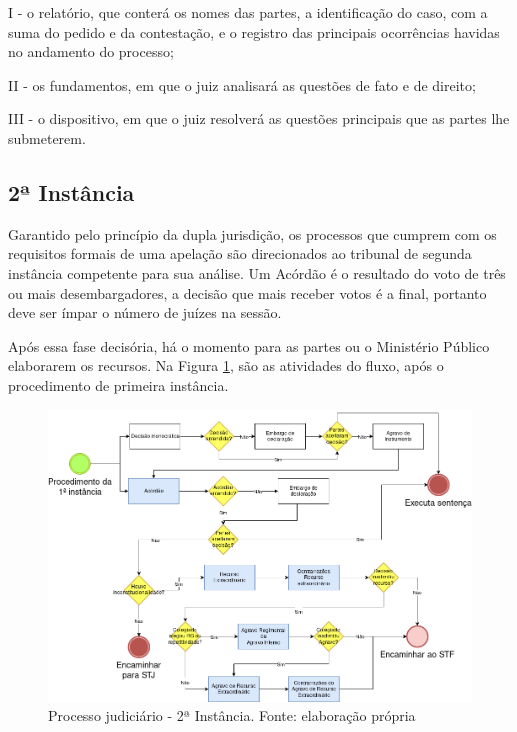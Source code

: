 \begin{citacao}
I - o relatório, que conterá os nomes das partes, a identificação do caso, com a suma do pedido e da contestação, e o registro das principais ocorrências havidas no andamento do processo;

II - os fundamentos, em que o juiz analisará as questões de fato e de direito;

III - o dispositivo, em que o juiz resolverá as questões principais que as partes lhe submeterem. \cite{BRASIL2015}
\end{citacao}

\subsection{2ª Instância}

Garantido pelo princípio da dupla jurisdição, os processos que cumprem com os requisitos formais de uma apelação são direcionados ao tribunal de segunda instância competente para sua análise. Um Acórdão é o resultado do voto de três ou mais desembargadores, a decisão que mais receber votos é a final, portanto deve ser ímpar o número de juízes na sessão. 

Após essa fase decisória, há o momento para as partes ou o Ministério Público elaborarem os recursos. Na Figura \ref{fig:processoSegunda}, são as atividades do fluxo, após o procedimento de primeira instância.

\begin{figure}[h]
	\centering
    \includegraphics[keepaspectratio=true,scale=0.5]{figuras/processoSegunda}
	\caption[Processo judiciário - 2ª Instância]{Processo judiciário - 2ª Instância. Fonte: elaboração própria}
	\label{fig:processoSegunda}
\end{figure}

